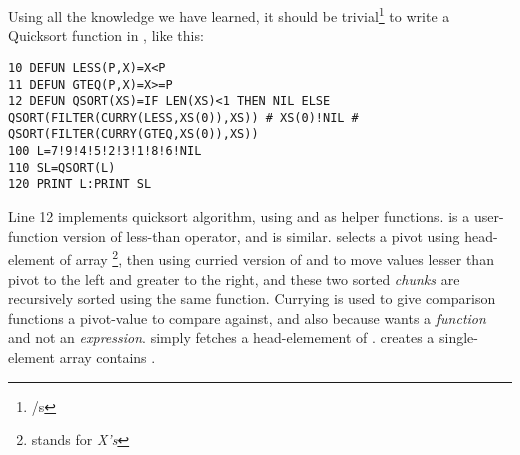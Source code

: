Using all the knowledge we have learned, it should be trivial\footnote{/s} to write a Quicksort function in \tbas, like this:

\begin{lstlisting}
10 DEFUN LESS(P,X)=X<P
11 DEFUN GTEQ(P,X)=X>=P
12 DEFUN QSORT(XS)=IF LEN(XS)<1 THEN NIL ELSE QSORT(FILTER(CURRY(LESS,XS(0)),XS)) # XS(0)!NIL # QSORT(FILTER(CURRY(GTEQ,XS(0)),XS))
100 L=7!9!4!5!2!3!1!8!6!NIL
110 SL=QSORT(L)
120 PRINT L:PRINT SL
\end{lstlisting}

Line 12 implements quicksort algorithm, using  and  as helper functions.  is a user-function version of less-than operator, and  is similar.  selects a pivot using head-element of array \footnote{stands for \emph{X's}}, then using curried version of  and  to move values lesser than pivot to the left and greater to the right, and these two sorted \emph{chunks} are recursively sorted using the same  function. Currying is used to give comparison functions a pivot-value to compare against, and also because  wants a \emph{function} and not an \emph{expression}.  simply fetches a head-elemement of .  creates a single-element array contains .

